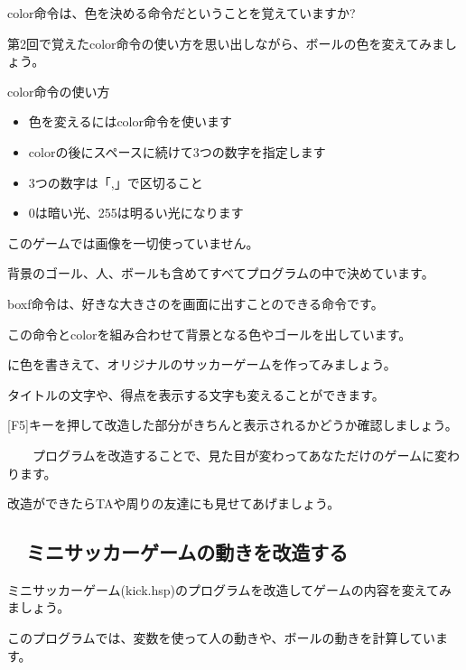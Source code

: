 color命令は、色を決める命令だということを覚えていますか?

第2回で覚えたcolor命令の使い方を思い出しながら、ボールの色を変えてみましょう。

\begin{itembox}[c]{color命令の使い方}
    \begin{itemize}
        \item 色を変えるにはcolor命令を使います
        \item colorの後にスペースに続けて3つの数字を指定します
        \item 3つの数字は「,」で区切ること
        \item 0は暗い光、255は明るい光になります
    \end{itemize}
\end{itembox}

このゲームでは画像を一切使っていません。

背景のゴール、人、ボールも含めてすべてプログラムの中で決めています。

boxf命令は、好きな大きさのを画面に出すことのできる命令です。

この命令とcolorを組み合わせて背景となる色やゴールを出しています。



に色を書きえて、オリジナルのサッカーゲームを作ってみましょう。

タイトルの文字や、得点を表示する文字も変えることができます。




\exampleanswer


[F5]キーを押して改造した部分がきちんと表示されるかどうか確認しましょう。

\ \ \ \ プログラムを改造することで、見た目が変わってあなただけのゲームに変わります。

改造ができたらTAや周りの友達にも見せてあげましょう。
\newpage
\subsection{\useOmetoiExample　ミニサッカーゲームの動きを改造する}

\exampleinduction

ミニサッカーゲーム(kick.hsp)のプログラムを改造してゲームの内容を変えてみましょう。

このプログラムでは、変数を使って人の動きや、ボールの動きを計算しています。

